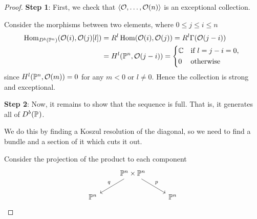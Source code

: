 \begin{proof}
    \textbf{Step 1}:
    First, we check that $\langle\O,\dots,\O(n)\rangle$ is an exceptional collection.

    Consider the morphisms between two elements, where $0\leq j\leq i \leq n$
    \begin{align*}
        \Hom_{D^b(\P^n)}(\O(i),\O(j)[l])
            &= R^l\Hom(\O(i),\O(j))
            = R^l\Gamma(\O(j-i)) \\
            &= H^l(\P^n,\O(j-i))
            = \begin{cases*}
                \C & if $l=j-i=0$, \\
                0 & otherwise
            \end{cases*}
    \end{align*}
    since $H^{l}(\P^n,\O(m))=0$ for any $m<0$ or $l \neq 0$. Hence the collection is strong and exceptional.

    \textbf{Step 2}: 
    Now, it remains to show that the sequence is full. That is, it generates all of $D^b(\P^{})$. 
    
    We do this by finding a Koszul resolution of the diagonal, so we need to find a bundle and a section of it which cuts it out.
    
    Consider the projection of the product to each component
    \begin{equation*}
        \begin{tikzcd}
            & \P^n\times\P^n \ar[dl,"q"'] \ar[dr,"p"] \\
            \P^n & & \P^n
        \end{tikzcd}
    \end{equation*}


\end{proof}
